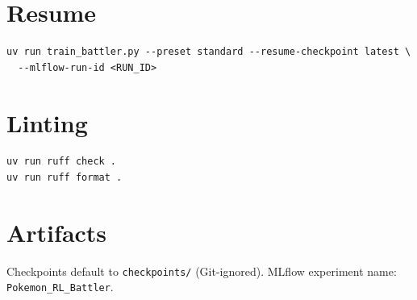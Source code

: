 \section{Resume}
\begin{verbatim}
uv run train_battler.py --preset standard --resume-checkpoint latest \
  --mlflow-run-id <RUN_ID>
\end{verbatim}

\section{Linting}
\begin{verbatim}
uv run ruff check .
uv run ruff format .
\end{verbatim}

\section{Artifacts}
Checkpoints default to \texttt{checkpoints/} (Git-ignored). MLflow experiment name: \texttt{Pokemon\_RL\_Battler}.
